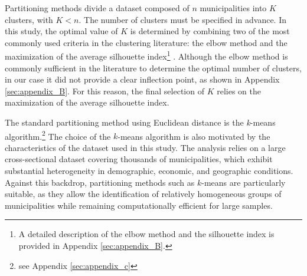 \documentclass[a4paper,11pt,oneside]{article}
\begin{document}


Partitioning methods divide a dataset composed of \(n\) municipalities into \(K\) clusters, with \(K<n\). The number of clusters must be specified in advance. In this study, the optimal value of \(K\) is determined by combining two of the most commonly used criteria in the clustering literature: the elbow method and the maximization of the average silhouette index\footnote{A detailed description of the elbow method and the silhouette index is provided in Appendix \ref{sec:appendix_B}.} \citep{januzaj2023determining}. Although the elbow method is commonly sufficient in the literature to determine the optimal number of clusters, in our case it did not provide a clear inflection point, as shown in Appendix \ref{sec:appendix_B}. For this reason, the final selection of \(K\) relies on the maximization of the average silhouette index.





The standard partitioning method using Euclidean distance is the \emph{k}-means algorithm.\footnote{see Appendix \ref{sec:appendix_c}} The choice of the $k$-means algorithm is also motivated by the characteristics of the dataset used in this study. The analysis relies on a large cross-sectional dataset covering thousands of municipalities, which exhibit substantial heterogeneity in demographic, economic, and geographic conditions. Against this backdrop, partitioning methods such as $k$-means are particularly suitable, as they allow the identification of relatively homogeneous groups of municipalities while remaining computationally efficient for large samples.
\end{document}
